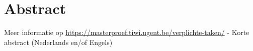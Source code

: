 \chapter*{Abstract}

Meer informatie op \href{https://masterproef.tiwi.ugent.be/verplichte-taken/}{https://masterproef.tiwi.ugent.be/verplichte-taken/} - Korte abstract (Nederlands en/of Engels)
